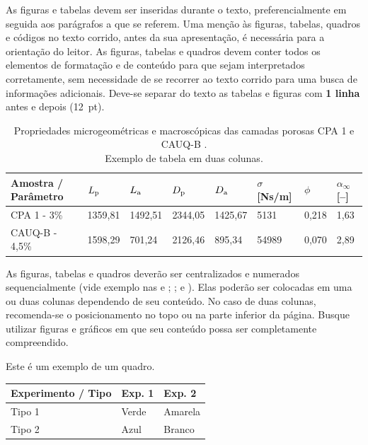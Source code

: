 \documentclass[12pt, a4paper, twoside, twocolumn]{article}
\begin{document}
As figuras e tabelas devem ser inseridas durante o texto, preferencialmente em seguida aos parágrafos a que se referem. Uma menção
às figuras, tabelas, quadros e códigos no texto corrido, antes da sua apresentação, é necessária para a orientação do leitor. As figuras, tabelas e quadros devem conter todos os elementos de formatação e de conteúdo para que sejam interpretados corretamente, sem necessidade de se recorrer ao texto corrido para uma busca de informações adicionais. Deve-se separar do texto as tabelas e figuras com \textbf{1 linha} antes e depois (12~pt). 


\begin{table}[!b]
  \centering {} 
  \caption{Propriedades microgeométricas e macroscópicas das camadas porosas CPA 1 e CAUQ-B \cite{Mareze-2017}.\\ Exemplo de tabela em duas colunas.}
	\fontsize{11}{12}\selectfont 
    \begin{tabular}{C{2.8cm} | C{1.5cm} | C{1.5cm} | C{1.5cm} | C{1.5cm} | C{1.5cm} | C{1.0cm}| C{1.0cm}}
    \toprule
    \textbf{ Amostra / Parâmetro } & $L_{\text{p}}$ \qquad [$\upmu$\! m] & $L_{\text{a}}$ \qquad [$\upmu$\! m] & $D_{\text{p}}$ \qquad [$\upmu$\! m] & $D_{\text{a}}$ \qquad [$\upmu$\! m] & $\sigma$ [Ns/m] & {$\phi$\quad [--]} & $\alpha_{\infty}$ [--]\\
	  \midrule
		CPA 1 -  3\% &	1359,81 & 1492,51 & 2344,05 & 1425,67 &	5131 &	0,218 &	1,63\\
		 CAUQ-B - 4,5\%	& 1598,29 &	701,24 & 2126,46 & 895,34 &	54989 &	0,070 &	2,89\\
    \bottomrule
    \end{tabular}
    \label{tab.exemplo}%
\end{table}%

As figuras, tabelas e quadros deverão ser centralizados e numerados sequencialmente (vide exemplo nas  e ; ;  e ). Elas poderão ser colocadas em uma ou duas colunas dependendo de seu conteúdo. No caso de duas colunas, recomenda-se o posicionamento no topo ou na parte inferior da página. Busque utilizar figuras e gráficos em que seu conteúdo possa ser completamente compreendido. 


\begin{quadro}[H]
  \centering {} \setlength\aboverulesep{0pt} \setlength\belowrulesep{0pt}
  \caption{Este é um exemplo de um quadro.}
	\fontsize{11}{12}\selectfont 
    \begin{tabular}{| C{2.8cm} | C{1.8cm} | C{1.8cm} |}
    \hline
    \textbf{ Experimento / Tipo } & \textbf{Exp. 1} & \textbf{Exp. 2}\\
	  \midrule
		Tipo 1& Verde & Amarela\\
		 Tipo 2 & Azul & Branco\\
		\hline
    \end{tabular}
    \label{quad.exemplo}%
		\vspace{-2mm}
\end{quadro}%
\end{document}
